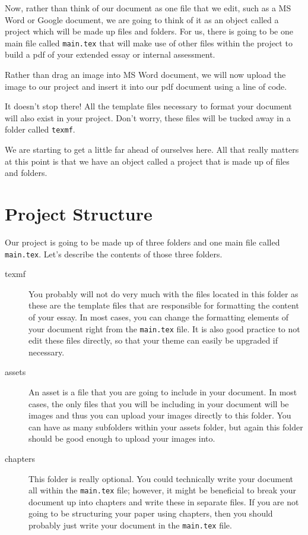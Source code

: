 Now, rather than think of our document as one file that we edit, such as a
MS Word or Google document, we are going to think of it as an object called a
project which will be made up files and folders. For us, there is going to be
one main file called \texttt{main.tex} that will make use of other files
within the project to build a pdf of your extended essay or internal assessment.

\begin{example}
  Rather than drag an image into MS Word document, we will now
  upload the image to our project and insert it into our pdf document using
  a line of code.
\end{example}

It doesn't stop there!  All the template files necessary to format your document
will also exist in your project.  Don't worry, these files will be tucked away
in a folder called \texttt{texmf}.

We are starting to get a little far ahead of ourselves here.  All that really
matters at this point is that we have an object called a project that is made up
of files and folders.

\section{Project Structure}
Our project is going to be made up of three folders and one main file called
\texttt{main.tex}. Let's describe the contents of those three folders.
\begin{description}
  \item[texmf] You probably will not do very much with the files located
        in this folder as these are the template files that are responsible for
        formatting the content of your essay. In most cases, you can change
        the formatting elements of your document right from the
        \texttt{main.tex} file.  It is also good practice to not edit these
        files directly, so that your theme can easily be upgraded if necessary.
  \item[assets] An asset is a file that you are going to include in your
        document.  In most cases, the only files that you will be including
        in your document will be images and thus you can upload your images
        directly to this folder.  You can have as many subfolders within your
        assets folder, but again this folder should be good enough to upload
        your images into.
  \item[chapters] This folder is really optional.  You could technically write
        your document all within the \texttt{main.tex} file; however, it might
        be beneficial to break your document up into chapters and
        write these in separate files.  If you are not going to be structuring
        your paper using chapters, then you should probably just write your
        document in the \texttt{main.tex} file.
\end{description}

